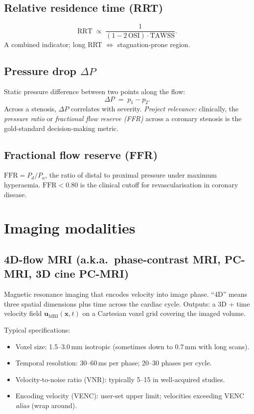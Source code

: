 \documentclass[11pt]{article}
\begin{document}
\subsection*{Relative residence time (RRT)}
\[
\mathrm{RRT} \;\propto\; \frac{1}{(1 - 2\,\mathrm{OSI}) \cdot \mathrm{TAWSS}}.
\]
A combined indicator; long RRT $\Leftrightarrow$ stagnation-prone region.

\subsection*{Pressure drop $\Delta P$}
Static pressure difference between two points along the flow:
\[
\Delta P \;=\; p_1 - p_2.
\]
Across a stenosis, $\Delta P$ correlates with severity. \textit{Project relevance:} clinically, the \emph{pressure ratio} or \emph{fractional flow reserve (FFR)} across a coronary stenosis is the gold-standard decision-making metric.

\subsection*{Fractional flow reserve (FFR)}
$\mathrm{FFR} = P_d / P_a$, the ratio of distal to proximal pressure under maximum hyperaemia. $\mathrm{FFR} < 0.80$ is the clinical cutoff for revascularisation in coronary disease.

\section{Imaging modalities}

\subsection*{4D-flow MRI (a.k.a.\ phase-contrast MRI, PC-MRI, 3D cine PC-MRI)}
Magnetic resonance imaging that encodes velocity into image phase. ``4D'' means three spatial dimensions plus time across the cardiac cycle. Outputs: a 3D + time velocity field $\mathbf{u}_{\text{MRI}}(\mathbf{x}, t)$ on a Cartesian voxel grid covering the imaged volume.

Typical specifications:
\begin{itemize}[noitemsep]
  \item Voxel size: 1.5--3.0\,mm isotropic (sometimes down to 0.7\,mm with long scans).
  \item Temporal resolution: 30--60\,ms per phase; 20--30 phases per cycle.
  \item Velocity-to-noise ratio (VNR): typically 5--15 in well-acquired studies.
  \item Encoding velocity (VENC): user-set upper limit; velocities exceeding VENC \emph{alias} (wrap around).
\end{itemize}
\end{document}
